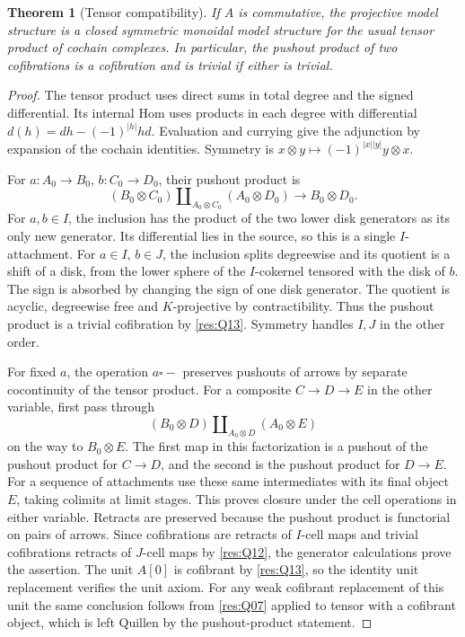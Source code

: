 \documentclass[11pt,oneside,openany]{book}
\newtheorem{theorem}{Theorem}[chapter]
\theoremstyle{definition}
\theoremstyle{remark}
\begin{document}
\begin{theorem}[Tensor compatibility]\label{res:Q15}
If \(A\) is commutative, the projective model structure
is a closed symmetric monoidal model structure for the
usual tensor product of cochain complexes. In particular,
the pushout product of two cofibrations is a cofibration
and is trivial if either is trivial.
\end{theorem}
\begin{proof}
The tensor product uses direct sums in total degree and
the signed differential. Its internal Hom uses products
in each degree with differential
\(d(h)=d h-(-1)^{|h|}h d\). Evaluation and currying give
the adjunction by expansion of the cochain identities.
Symmetry is \(x\otimes y\mapsto(-1)^{|x||y|}y\otimes x\).

For \(a:A_0\to B_0\), \(b:C_0\to D_0\), their
pushout product is
\[
 (B_0\otimes C_0)\amalg_{A_0\otimes C_0}(A_0\otimes D_0)
 \longrightarrow B_0\otimes D_0.
\]
For \(a,b\in I\), the inclusion has the product of the
two lower disk generators as its only new generator.
Its differential lies in the source, so this is a
single \(I\)-attachment. For \(a\in I\), \(b\in J\),
the inclusion splits degreewise and its quotient is
a shift of a disk, from the lower sphere of the
\(I\)-cokernel tensored with the disk of \(b\).
The sign is absorbed by changing the sign of one disk
generator. The quotient is acyclic, degreewise free
and \(K\)-projective by contractibility. Thus the
pushout product is a trivial cofibration by
\ref{res:Q13}. Symmetry handles \(I,J\) in the other order.

For fixed \(a\), the operation \(a\square -\)
preserves pushouts of arrows by separate cocontinuity
of the tensor product. For a composite \(C\to D\to E\)
in the other variable, first pass through
\[
 (B_0\otimes D)\amalg_{A_0\otimes D}(A_0\otimes E)
\]
on the way to \(B_0\otimes E\). The first map in
this factorization is a pushout of the pushout product
for \(C\to D\), and the second is the pushout product
for \(D\to E\). For a sequence of attachments use these
same intermediates with its final object \(E\), taking
colimits at limit stages. This proves closure under
the cell operations in either variable. Retracts are
preserved because the pushout product is functorial
on pairs of arrows. Since cofibrations are retracts
of \(I\)-cell maps and trivial cofibrations retracts
of \(J\)-cell maps by \ref{res:Q12}, the generator
calculations prove the assertion. The unit \(A[0]\)
is cofibrant by \ref{res:Q13}, so the identity unit
replacement verifies the unit axiom. For any weak
cofibrant replacement of this unit the same conclusion
follows from \ref{res:Q07} applied to tensor with a
cofibrant object, which is left Quillen by the
pushout-product statement.
\end{proof}
\end{document}
